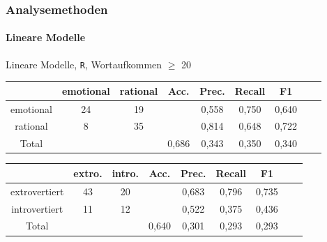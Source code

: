 \begin{frame}
\frametitle{Analysemethoden}
\framesubtitle{Lineare Modelle}
\begin{center}
Lineare Modelle, \texttt{R}, Wortaufkommen $\geq$ 20\\
\bigskip
\begin{tabular}{|c|c|c|c|c|c|c|c|c|}
\hline
				& emotional 	& rational	&  Acc.	& Prec. & Recall	& F1\\
\hline
emotional 		& 24			& 19 		&       & 0,558	& 0,750 	& 0,640\\
rational	 	& 8 			& 35		& 		& 0,814	& 0,648 	& 0,722\\
\hline
Total 			& 				& 			& 0,686	& 0,343	& 0,350  	& 0,340\\
\hline
\end{tabular}
\end{center}

\begin{center}
\bigskip
\begin{tabular}{|c|c|c|c|c|c|c|c|c|}
\hline
				& extro. 	& intro.	&  Acc.	& Prec. 	& Recall	& F1\\
\hline
extrovertiert	& 43		& 20		&       & 0,683 	& 0,796 	& 0,735\\
introvertiert 	& 11 		& 12		& 		& 0,522 	& 0,375 	& 0,436\\
\hline
Total 			& 			& 			& 0,640	& 0,301		& 0,293  	& 0,293\\
\hline
\end{tabular}
\end{center}

\vspace{12pt}

 \end{frame}

